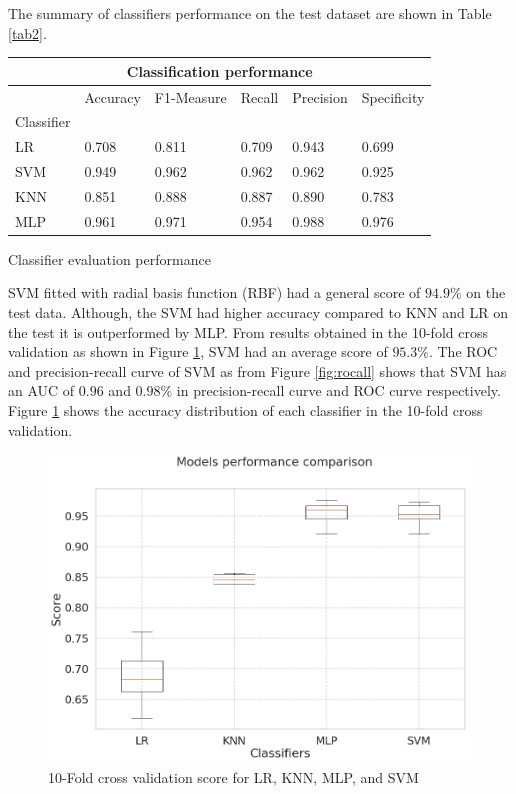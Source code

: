 \documentclass[final,5p,times,twocolumn,authoryear]{elsarticle}
\begin{document}
 The  summary of classifiers performance on the test dataset are shown in  Table \ref{tab2}. 
\begin{center}\label{kk}
	\begin{tabular}{ |p{1.1cm}|p{1.0cm}|p{1.1cm}|p{1.0cm}| p{1.1cm}|p{1.3cm}|} 

		\hline
		\multicolumn{6}{c}{\cellcolor{gray!50}Classification performance } \\
		\hline
		\hline
		\cline{1-6}

		&Accuracy &F1-Measure & Recall& Precision& Specificity\\
		Classifier & & & & &\\
		\cline{1-6}
		LR &0.708& 0.811&  	0.709 &0.943&0.699\\
		\hline
		SVM&   0.949  &0.962&	0.962 &0.962&0.925\\
		\hline
		KNN&0.851 &	0.888 &	0.887&0.890&0.783\\
		\hline
		MLP & 0.961& 0.971&	0.954&0.988&0.976 \\
		\hline
\end{tabular}
\captionsetup{type=table} 
\caption{Classifier evaluation performance }
\label{tab2}
\end{center}

SVM  fitted with radial basis function (RBF) had a general score of $94.9\%$ on the test data.  Although, the SVM had higher accuracy compared to KNN and LR on the test it is outperformed by MLP. From results obtained in the 10-fold cross validation as shown in Figure \ref{fig:k-foldcrossvalidation}, SVM had an average score of $95.3\%$. The ROC and precision-recall curve of SVM as from Figure \ref{fig:rocall} shows that SVM has an AUC of $0.96$ and $ 0.98\%$ in precision-recall curve and ROC curve respectively. Figure \ref{fig:k-foldcrossvalidation} shows the accuracy distribution of each  classifier in the 10-fold cross validation. \\

\begin{figure}[H]
	\centering
	\includegraphics[width=0.7\linewidth]{Figures/K-fold_cross_validation}
	\caption{10-Fold cross validation score for LR, KNN, MLP, and SVM}
	\label{fig:k-foldcrossvalidation}
\end{figure}
\end{document}
